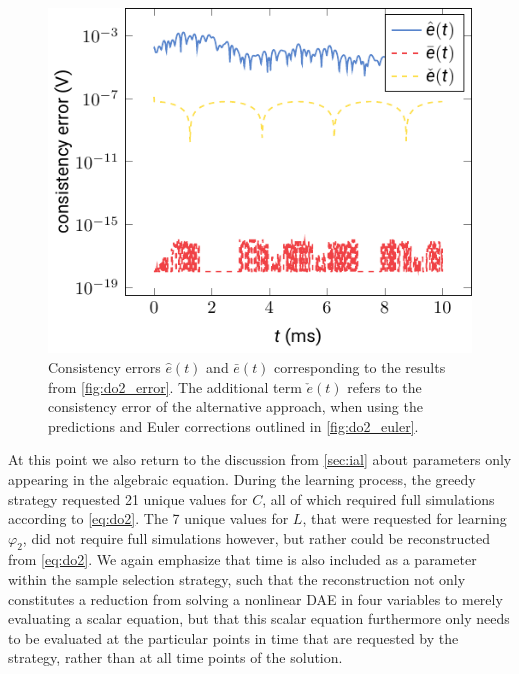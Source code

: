 \documentclass[AMA,STIX1COL]{WileyNJD-v2}
\begin{document}
\begin{figure}[b]
    \begin{center}
        \includegraphics[width=.4\textwidth]{do2_consistency}
    \end{center}
    \caption{Consistency errors $\hat{e}(t)$ and $\bar{e}(t)$ corresponding to the results from \autoref{fig:do2_error}. The additional term $\check{e}(t)$ refers to the consistency error of the alternative approach, when using the predictions and Euler corrections outlined in \autoref{fig:do2_euler}.}
    \label{fig:do2_consistency}
\end{figure}
At this point we also return to the discussion from \autoref{sec:ial} about parameters only appearing in the algebraic equation. During the learning process, the greedy strategy requested 21 unique values for $C$, all of which required full simulations according to \eqref{eq:do2}. The 7 unique values for $L$, that were requested for learning $\varphi_2$, did not require full simulations however, but rather could be reconstructed from \eqref{eq:do2}. We again emphasize that time is also included as a parameter within the sample selection strategy, such that the reconstruction not only constitutes a reduction from solving a nonlinear DAE in four variables to merely evaluating a scalar equation, but that this scalar equation furthermore only needs to be evaluated at the particular points in time that are requested by the strategy, rather than at all time points of the solution.
\end{document}
